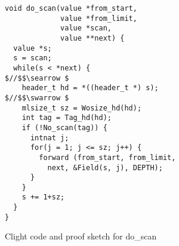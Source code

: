 \begin{figure}[t]
\vspace{-1ex}
  \begin{lstlisting}
void do_scan(value *from_start,  
             value *from_limit, 
             value *scan,  
             value **next) {
  value *s;
  s = scan;
  while(s < *next) {
$//$$\searrow $
    header_t hd = *((header_t *) s);
$//$$\swarrow $
    mlsize_t sz = Wosize_hd(hd);
    int tag = Tag_hd(hd);
    if (!No_scan(tag)) {
      intnat j;
      for(j = 1; j <= sz; j++) {
        forward (from_start, from_limit, 
          next, &Field(s, j), DEPTH);
      } 
    }
    s += 1+sz;
  }
} 
\end{lstlisting}

\vspace{-0.4em}
\caption{Clight code and proof sketch for do\_scan}
\label{fig:doscan}
\vspace{-1em}
\end{figure}